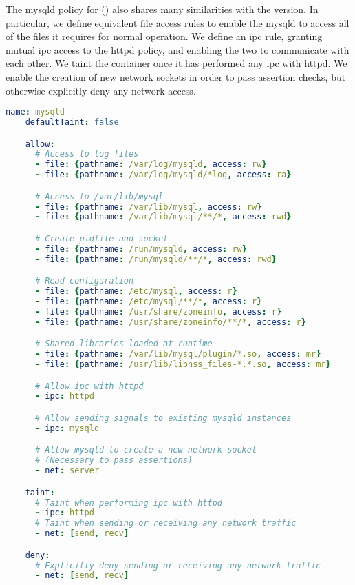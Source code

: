 The mysqld policy for \bpfcontain{} () also shares many
similarities with the \bpfbox{} version.  In particular, we define equivalent file access
rules to enable the mysqld to access all of the files it requires for normal operation. We
define an \gls{ipc} rule, granting mutual \gls{ipc} access to the httpd policy, and
enabling the two to communicate with each other. We taint the container once it has
performed any \gls{ipc} with httpd. We enable the creation of new network sockets
in order to pass assertion checks, but otherwise explicitly deny any network access.

\begin{lstlisting}[language=yaml, gobble=4, float=false, caption={[A \bpfcontain{} policy for MySQL]
  A \bpfcontain{} policy for MySQL.
  %\todo{Describe this}
}, label={lst:bpfcontain-mysql}]
    name: mysqld
    defaultTaint: false

    allow:
      # Access to log files
      - file: {pathname: /var/log/mysqld, access: rw}
      - file: {pathname: /var/log/mysqld/*log, access: ra}

      # Access to /var/lib/mysql
      - file: {pathname: /var/lib/mysql, access: rw}
      - file: {pathname: /var/lib/mysql/**/*, access: rwd}

      # Create pidfile and socket
      - file: {pathname: /run/mysqld, access: rw}
      - file: {pathname: /run/mysqld/**/*, access: rwd}

      # Read configuration
      - file: {pathname: /etc/mysql, access: r}
      - file: {pathname: /etc/mysql/**/*, access: r}
      - file: {pathname: /usr/share/zoneinfo, access: r}
      - file: {pathname: /usr/share/zoneinfo/**/*, access: r}

      # Shared libraries loaded at runtime
      - file: {pathname: /var/lib/mysql/plugin/*.so, access: mr}
      - file: {pathname: /usr/lib/libnss_files-*.*.so, access: mr}

      # Allow ipc with httpd
      - ipc: httpd

      # Allow sending signals to existing mysqld instances
      - ipc: mysqld

      # Allow mysqld to create a new network socket
      # (Necessary to pass assertions)
      - net: server

    taint:
      # Taint when performing ipc with httpd
      - ipc: httpd
      # Taint when sending or receiving any network traffic
      - net: [send, recv]

    deny:
      # Explicitly deny sending or receiving any network traffic
      - net: [send, recv]
\end{lstlisting}

